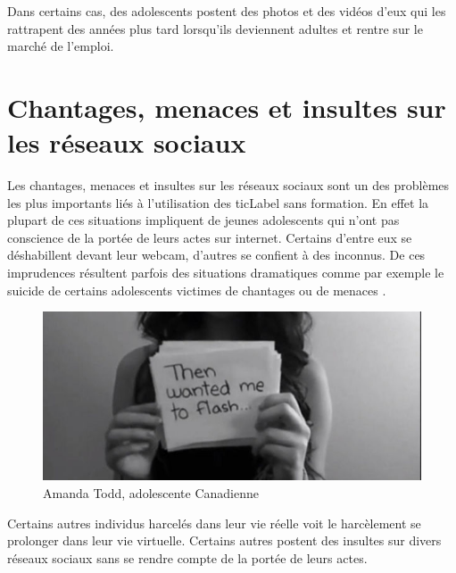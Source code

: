 Dans certains cas, des adolescents postent des photos et des vidéos
d'eux qui les rattrapent des années plus tard lorsqu'ils deviennent
adultes et rentre sur le marché de l'emploi.


\section{Chantages, menaces et insultes sur les réseaux sociaux}
Les chantages, menaces et insultes sur les réseaux sociaux sont un des problèmes les plus importants liés à l'utilisation des \gls{ticLabel} sans formation. En effet la plupart de ces situations impliquent de jeunes adolescents qui n'ont pas conscience de la portée de leurs actes sur internet. Certains d'entre eux se déshabillent devant leur webcam, d'autres se confient à des inconnus. De ces imprudences résultent parfois des situations dramatiques comme par exemple le suicide de certains adolescents victimes de chantages ou de menaces \cite{chantage_facebook, harcel_facebook}.

\begin{figure}[h]
\hspace{-2cm}
\includegraphics[scale=1]{../resources/illustrations/Amanda_Todd}
\caption{Amanda Todd, adolescente Canadienne}
\end{figure}

Certains autres individus harcelés dans leur vie réelle voit le harcèlement se prolonger dans leur vie virtuelle. Certains autres postent des insultes sur divers réseaux sociaux sans se rendre compte de la portée de leurs actes.




